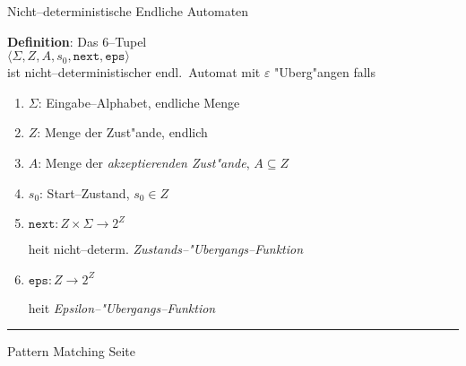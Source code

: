 
\begin{slide}{}
\normalsize

\begin{center}
Nicht--deterministische Endliche Automaten
\end{center}
\vspace*{0.5cm}

\footnotesize
\textbf{Definition}: Das 6--Tupel \\[0.3cm]
\hspace*{1.3cm} $\langle \Sigma, Z, A, s_0, \mathtt{next}, \mathtt{eps}  \rangle$ \\[0.3cm]
ist nicht--deterministischer endl.~Automat mit $\varepsilon$ "Uberg"angen 
falls
\begin{enumerate}
\item $\Sigma$: Eingabe--Alphabet, endliche Menge
\item $Z$: Menge der Zust"ande, endlich
\item $A$: Menge der \emph{akzeptierenden Zust"ande}, $A \subseteq Z$
\item $s_0$: Start--Zustand, $s_0 \in Z$
\item $\mathtt{next}: Z \times \Sigma \rightarrow 2^Z$

      hei\3t nicht--determ. \emph{Zustands--"Ubergangs--Funktion}
\item $\mathtt{eps}: Z  \rightarrow 2^Z$

      hei\3t  \emph{Epsilon--"Ubergangs--Funktion}
\end{enumerate}
\vspace*{-1cm}
\hspace*{-1cm}
\vspace*{\fill}

\tiny \addtocounter{mypage}{1}
\rule{17cm}{1mm}
Pattern Matching \hspace*{\fill} Seite 
\end{slide}


